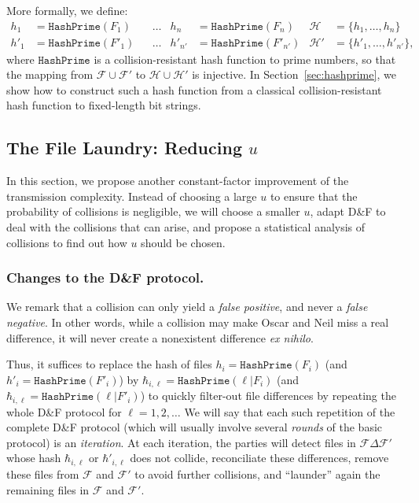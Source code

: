 \documentclass[11pt]{llncs}
\newcommand{\Set}{\mathcal{H}}
\newcommand{\Files}{\mathcal{F}}
\newcommand{\df}{D\&F\xspace}
\newcommand{\eg}{\textit{e.g.}\xspace}
\newcommand{\HashPrime}{\ensuremath{\mathtt{HashPrime}}}
\begin{document}
More formally, we define:
\begin{align*}
h_1 &= \HashPrime(F_1) & &\dots & h_n &= \HashPrime(F_n) & \Set &= \{h_1,\dots,h_n\} \\
h'_1 &= \HashPrime(F'_1) & &\dots & h'_{n'} &= \HashPrime(F'_{n'}) & \Set' &= \{h'_1,\dots,h'_{n'}\},
\end{align*}
where $\HashPrime$ is a collision-resistant hash function to prime numbers, so that the mapping from $\Files \cup \Files'$ to $\Set \cup \Set'$ is injective.
In Section~\ref{sec:hashprime}, we show how to construct such a hash function from a classical collision-resistant hash function to fixed-length bit strings.

\subsection{The File Laundry: Reducing $u$}
\label{sec:shortu}
In this section, we propose another constant-factor improvement of the transmission complexity. Instead of choosing a large $u$ to ensure that the probability of collisions is negligible, we will choose a smaller $u$, adapt \df to deal with the collisions that can arise, and propose a statistical analysis of collisions to find out how $u$ should be chosen.

\subsubsection{Changes to the \df protocol.}

We remark that a collision can only yield a \textit{false positive}, and never a \textit{false negative}. In other words, while a collision may make Oscar and Neil miss a real difference,
it will never create a nonexistent difference \textit{ex nihilo}.

Thus, it suffices to replace the hash of files $h_i = \HashPrime(F_i)$ (and $h'_i = \HashPrime(F'_i)$) by $\hbar_{i,\ell}=\HashPrime(\ell|F_i)$ (and $\hbar_{i,\ell} = \HashPrime(\ell|F'_i)$) to quickly filter-out file differences by repeating the whole \df protocol for $\ell=1,2,\ldots$ We will say that each such repetition of the complete \df protocol (which will usually involve several \emph{rounds} of the basic protocol) is an \emph{iteration}.
At each iteration, the parties will detect files in $\Files \Delta \Files'$ whose hash $\hbar_{i,\ell}$ or $\hbar'_{i,\ell}$ does not collide, reconciliate these differences, remove these files from $\Files$ and $\Files'$ to avoid further collisions, and ``launder'' again the remaining files in $\Files$ and $\Files'$.
\end{document}
